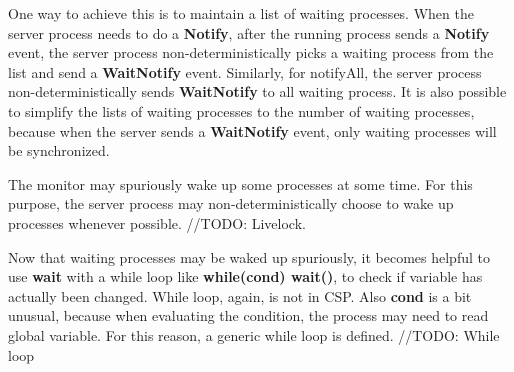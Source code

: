 \documentclass{article}
\begin{document}
One way to achieve this is to maintain a list of waiting processes. When the server process needs to do a \textbf{Notify}, after the running process sends a \textbf{Notify} event, the server process non-deterministically picks a waiting process from the list and send a \textbf{WaitNotify} event. Similarly, for notifyAll, the server process non-deterministically sends \textbf{WaitNotify} to all waiting process. It is also possible to simplify the lists of waiting processes to the number of waiting processes, because when the server sends a \textbf{WaitNotify} event, only waiting processes will be synchronized. 

The monitor may spuriously wake up some processes at some time. For this purpose, the server process may non-deterministically choose to wake up processes whenever possible. //TODO: Livelock.

Now that waiting processes may be waked up spuriously, it becomes helpful to use \textbf{wait} with a while loop like \textbf{while(cond) wait()}, to check if variable has actually been changed. While loop, again, is not in CSP. Also \textbf{cond} is a bit unusual, because when evaluating the condition, the process may need to read global variable. For this reason, a generic while loop is defined. //TODO: While loop
\end{document}

